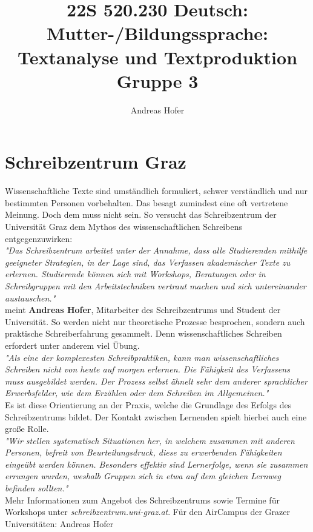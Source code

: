 \documentclass{article}
\title{\vspace{-3cm}22S 520.230 Deutsch: Mutter-/Bildungssprache: Textanalyse und Textproduktion Gruppe 3}
\author{Andreas Hofer}
\begin{document}
	\section{Schreibzentrum Graz}
	Wissenschaftliche Texte sind umständlich formuliert, schwer verständlich und nur bestimmten Personen vorbehalten. Das besagt zumindest eine oft vertretene Meinung. Doch dem muss nicht sein. So versucht das Schreibzentrum der Universität Graz dem Mythos des wissenschaftlichen Schreibens entgegenzuwirken: \\

	\textit{"Das Schreibzentrum arbeitet unter der Annahme, dass alle Studierenden mithilfe geeigneter Strategien, in der Lage sind, das Verfassen akademischer Texte zu erlernen. Studierende können sich mit Workshops, Beratungen oder in Schreibgruppen mit den Arbeitstechniken vertraut machen und sich untereinander austauschen."}  \\

	meint \textbf{Andreas Hofer}, Mitarbeiter des Schreibzentrums und Student der Universität. So werden nicht nur theoretische Prozesse besprochen, sondern auch praktische Schreiberfahrung gesammelt. Denn wissenschaftliches Schreiben erfordert unter anderem viel Übung.  \\

	\textit{"Als eine der komplexesten Schreibpraktiken, kann man wissenschaftliches Schreiben nicht von heute auf morgen erlernen. Die Fähigkeit des Verfassens muss ausgebildet werden. Der Prozess selbst ähnelt sehr dem anderer sprachlicher Erwerbsfelder, wie dem Erzählen oder dem Schreiben im Allgemeinen."}  \\

	Es ist diese Orientierung an der Praxis, welche die Grundlage des Erfolgs des Schreibzentrums bildet. Der Kontakt zwischen Lernenden spielt hierbei auch eine große Rolle.  \\

	\textit{"Wir stellen systematisch Situationen her, in welchem zusammen mit anderen Personen, befreit von Beurteilungsdruck, diese zu erwerbenden Fähigkeiten eingeübt werden können. Besonders effektiv sind Lernerfolge, wenn sie zusammen errungen wurden, weshalb Gruppen sich in etwa auf dem gleichen Lernweg befinden sollten."} \\

	Mehr Informationen zum Angebot des Schreibzentrums sowie Termine für Workshops unter \textit{schreibzentrum.uni-graz.at}.
	Für den AirCampus der Grazer Universitäten: Andreas Hofer
	
\end{document}
